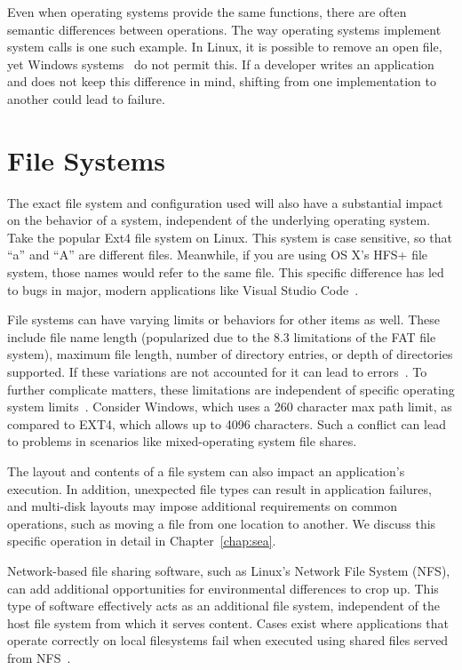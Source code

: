 Even when operating systems provide the same functions,
there are often semantic differences between operations. 
The way operating systems
implement system calls is one such example.  In Linux, it is possible to remove an open file, yet Windows systems~\cite{UnlinkStandard} do not permit this.  If a developer writes an application
and does not keep this difference in mind, shifting from one implementation to another could lead to failure.

\section{File Systems}

The exact file system and configuration used will also have a
substantial impact on the behavior of a system, independent of the underlying
operating system. Take the popular Ext4 file system on Linux. This system is case sensitive,
so that ``a'' and ``A'' are different files.
Meanwhile, if you are using OS X's HFS+ file system,
those names would refer to the same file.
This specific difference has led to bugs in major, modern applications like Visual Studio Code~\cite{vscodebug}.

File systems can have varying limits or behaviors for other items as well. These include file name length (popularized due to the 8.3 limitations of the
FAT file system), maximum file length, number of directory entries, or
depth
of directories supported.
If these variations are not accounted for it can lead to errors~\cite{EXT4Layout, AppleHFS}.
To further complicate matters,
these limitations are independent of specific operating system limits~\cite{windowspath}.
Consider Windows,
which uses a 260 character max path limit, as compared to EXT4, which allows up to 4096 characters.
Such a conflict can lead to problems in scenarios like mixed-operating system file shares.

The layout and contents of a file system can also impact an application's
execution.  In addition, unexpected file types can result in application
failures, and multi-disk layouts may impose additional requirements on
common operations, such as moving a file from one location to
another.  We discuss this specific operation in detail in Chapter~\ref{chap:sea}.

Network-based file sharing software, such as Linux's Network File System (NFS), can add  additional opportunities for environmental differences to crop up. This type of software effectively acts as an additional file system, independent of the host file system from which it serves content.
Cases exist where applications that operate correctly on local filesystems fail when executed using shared files served from NFS~\cite{gitlabbug}.

